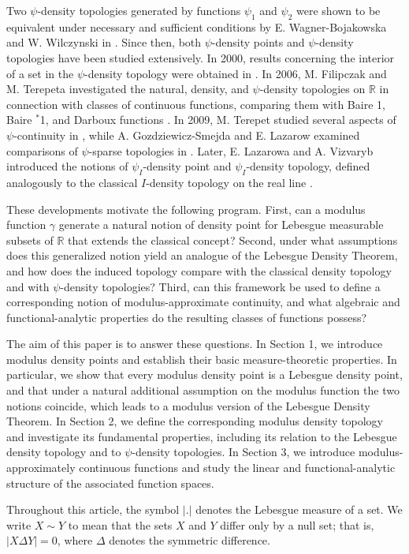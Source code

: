 \documentclass{amsart}
\theoremstyle{plain}
\numberwithin{equation}{section}
\begin{document}
Two $\psi$-density topologies generated by functions $\psi_1$ and $\psi_2$ were shown to be equivalent under necessary and sufficient conditions by E. Wagner-Bojakowska and W. Wilczynski in \cite{wewc}. Since then, both $\psi$-density points and $\psi$-density topologies have been studied extensively. In 2000, results concerning the interior of a set in the $\psi$-density topology were obtained in \cite{wewt}. In 2006, M. Filipczak and M. Terepeta investigated the natural, density, and $\psi$-density topologies on $\mathbb{R}$ in connection with classes of continuous functions, comparing them with Baire 1, Baire $^*$1, and Darboux functions \cite{fmmto}. In 2009, M. Terepet studied several aspects of $\psi$-continuity in \cite{tma}, while A. Gozdziewicz-Smejda and E. Lazarow examined comparisons of $\psi$-sparse topologies in \cite{gawc}. Later, E. Lazarowa and A. Vizvaryb introduced the notions of $\psi_{I}$-density point and $\psi_{I}$-density topology, defined analogously to the classical $I$-density topology on the real line \cite{teavpsi}.

These developments motivate the following program. First, can a modulus function $\gamma$ generate a natural notion of density point for Lebesgue measurable subsets of $\mathbb{R}$ that extends the classical concept? Second, under what assumptions does this generalized notion yield an analogue of the Lebesgue Density Theorem, and how does the induced topology compare with the classical density topology and with $\psi$-density topologies? Third, can this framework be used to define a corresponding notion of modulus-approximate continuity, and what algebraic and functional-analytic properties do the resulting classes of functions possess?

The aim of this paper is to answer these questions. In Section 1, we introduce modulus density points and establish their basic measure-theoretic properties. In particular, we show that every modulus density point is a Lebesgue density point, and that under a natural additional assumption on the modulus function the two notions coincide, which leads to a modulus version of the Lebesgue Density Theorem. In Section 2, we define the corresponding modulus density topology and investigate its fundamental properties, including its relation to the Lebesgue density topology and to $\psi$-density topologies. In Section 3, we introduce modulus-approximately continuous functions and study the linear and functional-analytic structure of the associated function spaces.

Throughout this article, the symbol $|.|$ denotes the Lebesgue measure of a set. We write $X \sim Y$ to mean that the sets $X$ and $Y$ differ only by a null set; that is, $|X \Delta Y| = 0$, where $\Delta$ denotes the symmetric difference.
\end{document}

